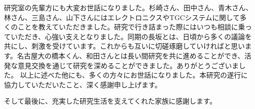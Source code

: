 研究室の先輩方にも大変お世話になりました。杉崎さん、田中さん、青木さん、林さん、三島さん、山下さんにはエレクトロニクスやTGCシステムに関して多くのことを教えていただきました。研究で行き詰まった際にはいつも相談に乗っていただき、心強い支えとなりました。同期の長坂とは、日頃から多くの議論を共にし、刺激を受けています。これからも互いに切磋琢磨していければと思います。名古屋大の橋本くん、和田さんとは長い間研究を共に進めることができ、活発な意見交換を通じて研究を深めることができました。ありがとうございました。
以上に述べた他にも、多くの方々にお世話になりました。本研究の遂行に協力していただいたこと、深く感謝申し上げます。

そして最後に、充実した研究生活を支えてくれた家族に感謝します。

